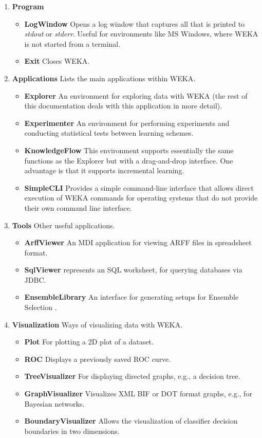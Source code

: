 \documentclass[a4paper]{article}
\begin{document}
\begin{enumerate}
	\item \textbf{Program}
		\begin{itemize}
			\item \textbf{LogWindow} Opens a log window that captures all that is printed to \textit{stdout} or \textit{stderr}. Useful for environments like MS Windows, where WEKA is not started from a terminal.
			\item \textbf{Exit} Closes WEKA.
		\end{itemize}
		
	\item \textbf{Applications} Lists the main applications within WEKA.
		\begin{itemize}
			\item \textbf{Explorer} An environment for exploring data with
WEKA (the rest of this documentation deals with this application in more detail).
			\item \textbf{Experimenter} An environment for performing experiments and conducting statistical tests
between learning schemes.
			\item \textbf{KnowledgeFlow} This environment supports essentially
the same functions as the Explorer but with a drag-and-drop
interface. One advantage is that it supports incremental learning.
			\item \textbf{SimpleCLI} Provides a simple command-line interface
that allows direct execution of WEKA commands for operating systems
that do not provide their own command line interface.
		\end{itemize}
		
	\item \textbf{Tools} Other useful applications.
		\begin{itemize}
			\item \textbf{ArffViewer} An MDI application for viewing ARFF files in spreadsheet format.
			\item \textbf{SqlViewer} represents an SQL worksheet, for querying databases via JDBC.
			\item \textbf{EnsembleLibrary} An interface for generating setups for Ensemble Selection \cite{ensemble}.
		\end{itemize}
		
	\item \textbf{Visualization} Ways of visualizing data with WEKA.
		\begin{itemize}
			\item \textbf{Plot} For plotting a 2D plot of a dataset.
			\item \textbf{ROC} Displays a previously saved ROC curve.
			\item \textbf{TreeVisualizer} For displaying directed graphs, e.g., a decision tree.
			\item \textbf{GraphVisualizer} Visualizes XML BIF or DOT format graphs, e.g., for Bayesian networks.
			\item \textbf{BoundaryVisualizer} Allows the visualization of classifier decision boundaries in two dimensions.
		\end{itemize}
		

\end{enumerate}
\end{document}
